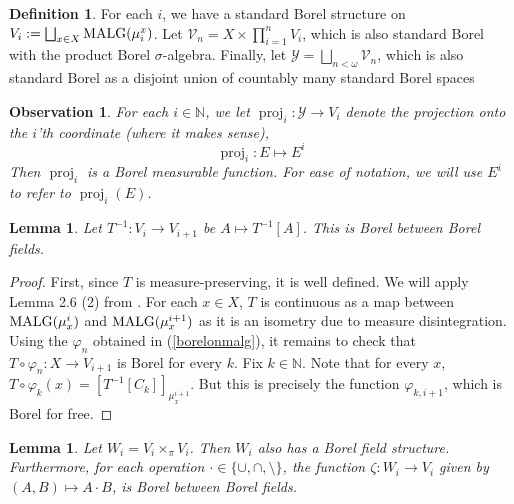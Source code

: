 \documentclass{article}
\newcommand{\N}{\mathbb{N}}
\DeclareMathOperator{\proj}{proj}
\newcommand{\malg}[1]{\textmd{MALG}(#1)}
\let\oldref\ref
\renewcommand{\ref}[1]{(\oldref{#1})}
\newtheorem{lemma}[theorem]{Lemma}
\newtheorem{observation}[theorem]{Observation}
\theoremstyle{definition}
\newtheorem{definition}[theorem]{Definition}
\begin{document}
\begin{definition}
     For each $ i $, we have a standard Borel structure on $ V_i:= \bigsqcup_{x\in X} \malg{\mu^x_i} $. Let $ \mathcal{V}_n = X \times \prod_{i=1}^n V_i $, which is also standard Borel with the product Borel $ \sigma $-algebra. Finally, let $ \mathcal{Y} = \bigsqcup_{n<\omega} \mathcal{V}_n $, which is also standard Borel as a disjoint union of countably many standard Borel spaces
\end{definition}
\begin{observation}
    For each $ i\in \mathbb{N} $, we let $ \proj_i:\mathcal{Y}\rightarrow V_i $ denote the projection onto the $ i $'th coordinate (where it makes sense),
    \[
    \proj_i:E\mapsto E^i
    \]
    Then $ \proj_i $ is a Borel measurable function. For ease of notation, we will use $ E^i $ to refer to $ \proj_i(E) $.
\end{observation}
\begin{lemma}\label{first lem}
    Let $ T^{-1}:V_i\rightarrow V_{i+1} $ be $ A\mapsto T^{-1}[A] $. This is Borel between Borel fields. 
\end{lemma}
\begin{proof}
    First, since $ T $ is measure-preserving, it is well defined. We will apply Lemma 2.6 (2) from \cite{borelfieldpaper}. For each $ x\in X $, $ T $ is continuous as a map between $ \malg{\mu_x^i} $ and $ \malg{\mu_x^{i+1}} $ as it is an isometry due to measure disintegration. Using the $ \varphi_n $ obtained in \ref{borelonmalg}, it remains to check that $ T\circ \varphi_n:X\rightarrow V_{i+1} $ is Borel for every $ k $. Fix $ k\in \N $. Note that for every $ x $, $ T\circ \varphi_k(x) = [T^{-1}[C_k]]_{\mu_x^{i+1}} $. But this is precisely the function $ \varphi_{k,i+1} $, which is Borel for free.
\end{proof}
\begin{lemma}\label{second lem}
    Let $ W_i = V_i\times_\pi V_i $. Then $ W_i $ also has a Borel field structure. Furthermore, for each operation $ \cdot \in \{\cup, \cap, \setminus\} $, the function $ \zeta: W_i \rightarrow V_{i}$ given by $ (A,B)\mapsto A \cdot B $, is Borel between Borel fields. 
\end{lemma}
\end{document}
